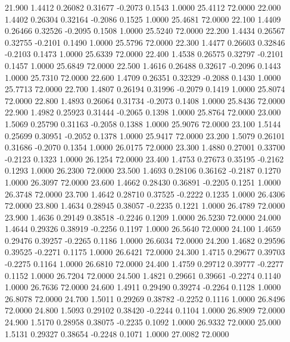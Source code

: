   21.900   1.4412   0.26082   0.31677  -0.2073   0.1543   1.0000  25.4112  72.0000
  22.000   1.4402   0.26304   0.32164  -0.2086   0.1525   1.0000  25.4681  72.0000
  22.100   1.4409   0.26466   0.32526  -0.2095   0.1508   1.0000  25.5240  72.0000
  22.200   1.4434   0.26567   0.32755  -0.2101   0.1490   1.0000  25.5796  72.0000
  22.300   1.4477   0.26603   0.32846  -0.2103   0.1473   1.0000  25.6339  72.0000
  22.400   1.4538   0.26575   0.32797  -0.2101   0.1457   1.0000  25.6849  72.0000
  22.500   1.4616   0.26488   0.32617  -0.2096   0.1443   1.0000  25.7310  72.0000
  22.600   1.4709   0.26351   0.32329  -0.2088   0.1430   1.0000  25.7713  72.0000
  22.700   1.4807   0.26194   0.31996  -0.2079   0.1419   1.0000  25.8074  72.0000
  22.800   1.4893   0.26064   0.31734  -0.2073   0.1408   1.0000  25.8436  72.0000
  22.900   1.4982   0.25923   0.31444  -0.2065   0.1398   1.0000  25.8764  72.0000
  23.000   1.5069   0.25790   0.31163  -0.2058   0.1388   1.0000  25.9076  72.0000
  23.100   1.5144   0.25699   0.30951  -0.2052   0.1378   1.0000  25.9417  72.0000
  23.200   1.5079   0.26101   0.31686  -0.2070   0.1354   1.0000  26.0175  72.0000
  23.300   1.4880   0.27001   0.33700  -0.2123   0.1323   1.0000  26.1254  72.0000
  23.400   1.4753   0.27673   0.35195  -0.2162   0.1293   1.0000  26.2300  72.0000
  23.500   1.4693   0.28106   0.36162  -0.2187   0.1270   1.0000  26.3097  72.0000
  23.600   1.4662   0.28430   0.36891  -0.2205   0.1251   1.0000  26.3748  72.0000
  23.700   1.4642   0.28710   0.37525  -0.2222   0.1235   1.0000  26.4306  72.0000
  23.800   1.4634   0.28945   0.38057  -0.2235   0.1221   1.0000  26.4789  72.0000
  23.900   1.4636   0.29149   0.38518  -0.2246   0.1209   1.0000  26.5230  72.0000
  24.000   1.4644   0.29326   0.38919  -0.2256   0.1197   1.0000  26.5640  72.0000
  24.100   1.4659   0.29476   0.39257  -0.2265   0.1186   1.0000  26.6034  72.0000
  24.200   1.4682   0.29596   0.39525  -0.2271   0.1175   1.0000  26.6421  72.0000
  24.300   1.4715   0.29677   0.39703  -0.2275   0.1164   1.0000  26.6810  72.0000
  24.400   1.4759   0.29712   0.39777  -0.2277   0.1152   1.0000  26.7204  72.0000
  24.500   1.4821   0.29661   0.39661  -0.2274   0.1140   1.0000  26.7636  72.0000
  24.600   1.4911   0.29490   0.39274  -0.2264   0.1128   1.0000  26.8078  72.0000
  24.700   1.5011   0.29269   0.38782  -0.2252   0.1116   1.0000  26.8496  72.0000
  24.800   1.5093   0.29102   0.38420  -0.2244   0.1104   1.0000  26.8909  72.0000
  24.900   1.5170   0.28958   0.38075  -0.2235   0.1092   1.0000  26.9332  72.0000
  25.000   1.5131   0.29327   0.38654  -0.2248   0.1071   1.0000  27.0082  72.0000
